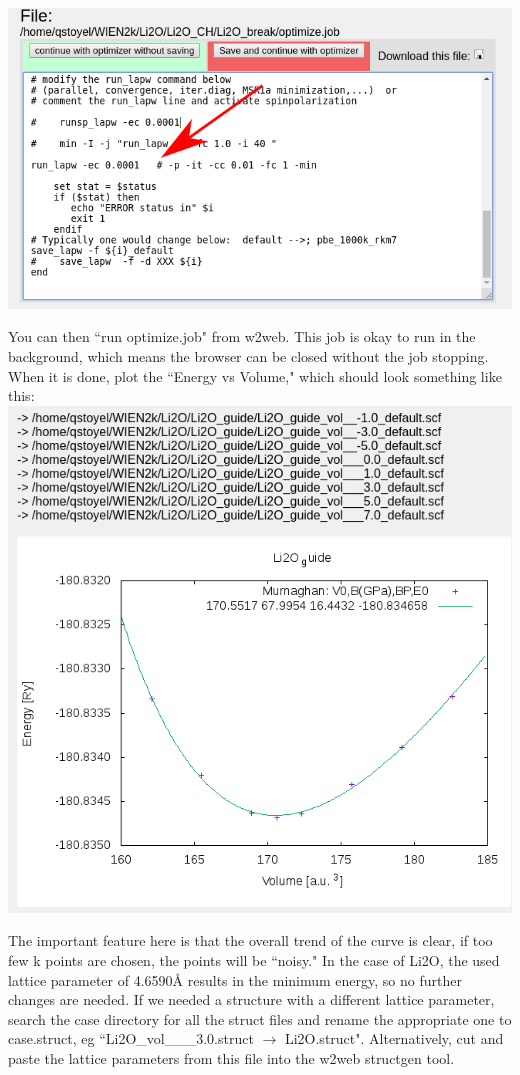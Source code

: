 \documentclass[12pt]{article}
\newcommand{\angstrom}{\mbox{\normalfont\AA }} %
\begin{document}
\includegraphics[scale=0.4]{./images/vol_opt2.png}

You can then ``run optimize.job" from w2web. This job is okay to run in the background, which means the browser can be closed without the job stopping.  When it is done, plot the ``Energy vs Volume," which should look something like this:\\
  
\includegraphics[scale=0.3]{./images/E_vs_V.png}

The important feature here is that the overall trend of the curve is clear, if too few k points are chosen, the points will be ``noisy." In the case of Li2O, the used lattice parameter of 4.6590\angstrom { }results in the minimum energy, so no further changes are needed. If we needed a structure with a different lattice parameter, search the case directory for all the struct files and rename the appropriate one to case.struct, eg ``Li2O\_vol\_\_\_3.0.struct $\to$ Li2O.struct". Alternatively, cut and paste the lattice parameters from this file into the w2web structgen tool.    
\end{document}

